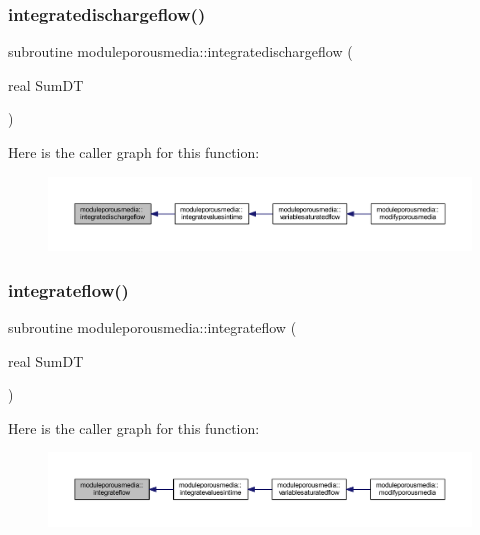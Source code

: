 \subsubsection{\texorpdfstring{integratedischargeflow()}{integratedischargeflow()}}
{\footnotesize\ttfamily subroutine moduleporousmedia\+::integratedischargeflow (\begin{DoxyParamCaption}\item[{real}]{Sum\+DT }\end{DoxyParamCaption})\hspace{0.3cm}{\ttfamily [private]}}

Here is the caller graph for this function\+:\nopagebreak
\begin{figure}[H]
\begin{center}
\leavevmode
\includegraphics[width=350pt]{namespacemoduleporousmedia_ad3dd92d2f8b726911dbb895f480b0725_icgraph}
\end{center}
\end{figure}
\mbox{\label{namespacemoduleporousmedia_ab03d5744de85ffec6652ff0b88896f38}} 
\subsubsection{\texorpdfstring{integrateflow()}{integrateflow()}}
{\footnotesize\ttfamily subroutine moduleporousmedia\+::integrateflow (\begin{DoxyParamCaption}\item[{real}]{Sum\+DT }\end{DoxyParamCaption})\hspace{0.3cm}{\ttfamily [private]}}

Here is the caller graph for this function\+:\nopagebreak
\begin{figure}[H]
\begin{center}
\leavevmode
\includegraphics[width=350pt]{namespacemoduleporousmedia_ab03d5744de85ffec6652ff0b88896f38_icgraph}
\end{center}
\end{figure}
\mbox{\label{namespacemoduleporousmedia_a65ff629d0c1ef9ecd5231bc72cc38c06}} 
